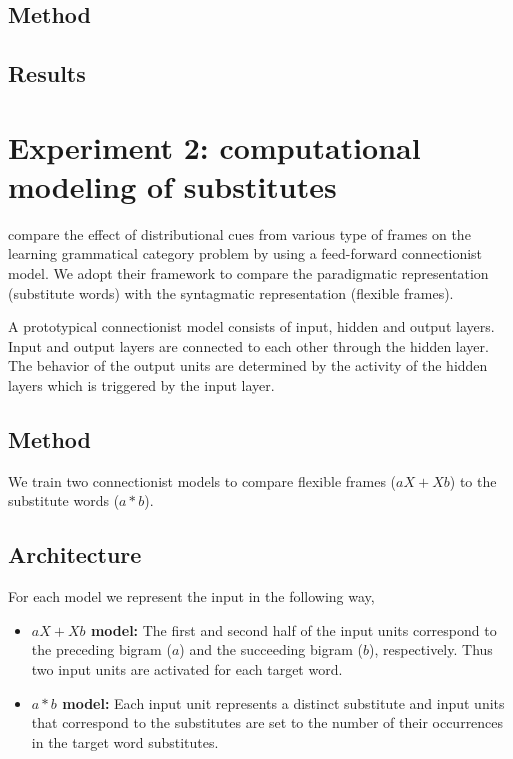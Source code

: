 \subsection{Method}
\subsection{Results}

\section{Experiment 2: computational modeling of substitutes}

\cite{20674613} compare the effect of distributional cues from various
type of frames on the learning grammatical category problem by using a
feed-forward connectionist model.  We adopt their framework to compare
the paradigmatic representation (substitute words) with the
syntagmatic representation (flexible frames).

A prototypical connectionist model consists of input, hidden and
output layers.  Input and output layers are connected to each other
through the hidden layer.  The behavior of the output units are
determined by the activity of the hidden layers which is triggered by
the input layer.

\subsection{Method}

We train two connectionist models to compare flexible frames ($aX+Xb$)
to the substitute words ($a*b$).

\subsection{Architecture}
For each model we represent the input in the following way,

\begin{itemize}
\item {\bf$aX+Xb$ model:} The first and second half of the input units
  correspond to the preceding bigram ($a$) and the succeeding bigram
  ($b$), respectively.  Thus two input units are activated for each
  target word.
\item {\bf $a*b$ model:} Each input unit represents a distinct
  substitute and input units that correspond to the substitutes are set
  to the number of their occurrences in the target word substitutes.
\end{itemize}

